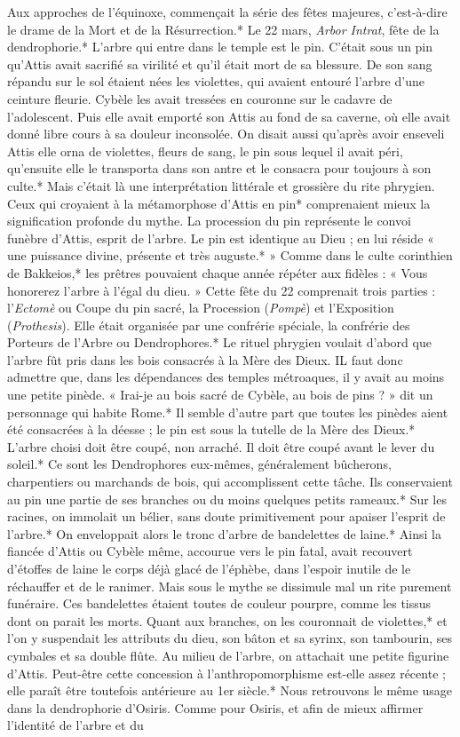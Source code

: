 \documentclass[a4paper, 11pt, oneside, polutonikogreek, french]{article}
\begin{document}
Aux approches de l'équinoxe, commençait la série des fêtes majeures, c'est-à-dire le drame de la Mort et de la Résurrection.* Le 22 mars, \emph{Arbor Intrat}, fête de la dendrophorie.* L'arbre qui entre dans le temple est le pin. C'était sous un pin qu'Attis avait sacrifié sa virilité et qu'il était mort de sa blessure. De son sang répandu sur le sol étaient nées les violettes, qui avaient entouré l'arbre d'une ceinture fleurie. Cybèle les avait tressées en couronne sur le cadavre de l'adolescent. Puis elle avait emporté son Attis au fond de sa caverne, où elle avait donné libre cours à sa douleur inconsolée. On disait aussi qu'après avoir enseveli Attis elle orna de violettes, fleurs de sang, le pin sous lequel il avait péri, qu'ensuite elle le transporta dans son antre et le consacra pour toujours à son culte.* Mais c'était là une interprétation littérale et grossière du rite phrygien. Ceux qui croyaient à la métamorphose d'Attis en pin* comprenaient mieux la signification profonde du mythe. La procession du pin représente le convoi funèbre d'Attis, esprit de l'arbre. Le pin est identique au Dieu ; en lui réside « une puissance divine, présente et très auguste.* » Comme dans le culte corinthien de Bakkeios,* les prêtres pouvaient chaque année répéter aux fidèles : « Vous honorerez l'arbre à l'égal du dieu. » Cette fête du 22 comprenait trois parties : l'\emph{Ectomè} ou Coupe du pin sacré, la Procession (\emph{Pompè}) et l'Exposition (\emph{Prothesis}). Elle était organisée par une confrérie spéciale, la confrérie des Porteurs de l'Arbre ou Dendrophores.* Le rituel phrygien voulait d'abord que l'arbre fût pris dans les bois consacrés à la Mère des Dieux. IL faut donc admettre que, dans les dépendances des temples métroaques, il y avait au moins une petite pinède. « Irai-je au bois sacré de Cybèle, au bois de pins ? » dit un personnage qui habite Rome.* Il semble d'autre part que toutes les pinèdes aient été consacrées à la déesse ; le pin est sous la tutelle de la Mère des Dieux.* L'arbre choisi doit être coupé, non arraché. Il doit être coupé avant le lever du soleil.* Ce sont les Dendrophores eux-mêmes, généralement bûcherons, charpentiers ou marchands de bois, qui accomplissent cette tâche. Ils conservaient au pin une partie de ses branches ou du moins quelques petits rameaux.* Sur les racines, on immolait un bélier, sans doute primitivement pour apaiser l'esprit de l'arbre.* On enveloppait alors le tronc d'arbre de bandelettes de laine.* Ainsi la fiancée d'Attis ou Cybèle même, accourue vers le pin fatal, avait recouvert d'étoffes de laine le corps déjà glacé de l'éphèbe, dans l'espoir inutile de le réchauffer et de le ranimer. Mais sous le mythe se dissimule mal un rite purement funéraire. Ces bandelettes étaient toutes de couleur pourpre, comme les tissus dont on parait les morts. Quant aux branches, on les couronnait de violettes,* et l'on y suspendait les attributs du dieu, son bâton et sa syrinx, son tambourin, ses cymbales et sa double flûte. Au milieu de l'arbre, on attachait une petite figurine d'Attis. Peut-être cette concession à l'anthropomorphisme est-elle assez récente ; elle paraît être toutefois antérieure au 1er siècle.* Nous retrouvons le même usage dans la dendrophorie d'Osiris. Comme pour Osiris, et afin de mieux affirmer l'identité de l'arbre et du 
\end{document}
